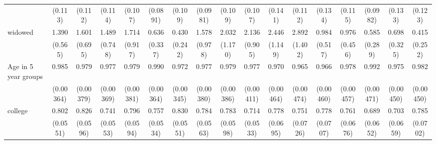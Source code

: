 {\begin{tabular}{l*{16}{c}}
                    &     (0.113)         &     (0.112)         &     (0.114)         &     (0.107)         &    (0.0891)         &     (0.109)         &    (0.0981)         &     (0.109)         &     (0.107)         &     (0.141)         &     (0.112)         &     (0.134)         &     (0.115)         &    (0.0982)         &     (0.133)         &     (0.123)         \\
[1em]
widowed             &       1.390         &       1.601         &       1.489         &       1.714         &       0.636         &       0.430         &       1.578         &       2.032         &       2.136         &       2.446         &       2.892\sym{*}  &       0.984         &       0.976         &       0.585         &       0.698         &       0.415         \\
                    &     (0.565)         &     (0.695)         &     (0.748)         &     (0.917)         &     (0.337)         &     (0.242)         &     (0.978)         &     (1.170)         &     (0.905)         &     (1.149)         &     (1.402)         &     (0.517)         &     (0.456)         &     (0.289)         &     (0.325)         &     (0.252)         \\
[1em]
Age in 5 year groups&       0.985\sym{***}&       0.979\sym{***}&       0.977\sym{***}&       0.979\sym{***}&       0.990\sym{**} &       0.972\sym{***}&       0.977\sym{***}&       0.979\sym{***}&       0.977\sym{***}&       0.970\sym{***}&       0.965\sym{***}&       0.966\sym{***}&       0.978\sym{***}&       0.992         &       0.975\sym{***}&       0.982\sym{***}\\
                    &   (0.00364)         &   (0.00379)         &   (0.00369)         &   (0.00381)         &   (0.00364)         &   (0.00345)         &   (0.00380)         &   (0.00386)         &   (0.00411)         &   (0.00464)         &   (0.00474)         &   (0.00460)         &   (0.00457)         &   (0.00471)         &   (0.00450)         &   (0.00450)         \\
[1em]
college             &       0.802\sym{**} &       0.826\sym{**} &       0.741\sym{***}&       0.796\sym{**} &       0.757\sym{***}&       0.830\sym{**} &       0.784\sym{***}&       0.783\sym{**} &       0.714\sym{***}&       0.778\sym{**} &       0.751\sym{**} &       0.778\sym{**} &       0.761\sym{**} &       0.689\sym{***}&       0.703\sym{***}&       0.785\sym{**} \\
                    &    (0.0551)         &    (0.0596)         &    (0.0553)         &    (0.0594)         &    (0.0534)         &    (0.0551)         &    (0.0563)         &    (0.0598)         &    (0.0533)         &    (0.0695)         &    (0.0726)         &    (0.0707)         &    (0.0676)         &    (0.0652)         &    (0.0659)         &    (0.0702)         \\

\end{tabular}}
